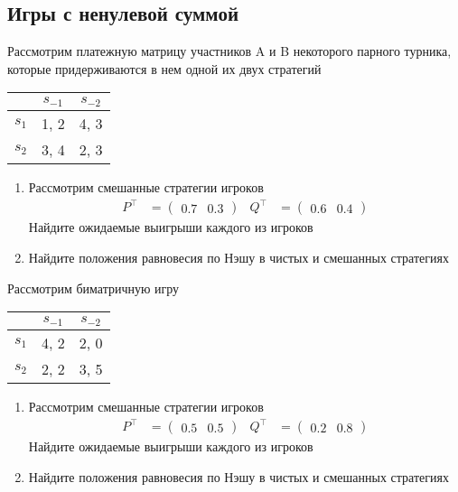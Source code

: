 \subsection{Игры с ненулевой суммой}

\begin{exercise}
Рассмотрим платежную матрицу участников A и B некоторого парного турника,
которые придерживаются в нем одной их двух стратегий
\begin{center}
	\begin{tabular}{|c||c|c|}
	\hline
	& $s_{-1}$ & $s_{-2}$  \\ \hline \hline
	$s_1$ & 1, 2 & 4, 3  \\ \hline
	$s_2$ & 3, 4 & 2, 3  \\ %
	\hline
	\end{tabular}
\end{center}
\begin{enumerate}
	\item Рассмотрим  смешанные стратегии игроков 
	\begin{align*}
		P^\top&=\begin{pmatrix} 0.7 & 0.3 \end{pmatrix} &
		Q^\top&=\begin{pmatrix} 0.6 & 0.4 \end{pmatrix}
	\end{align*}
	Найдите ожидаемые выигрыши каждого из игроков
	\item Найдите положения равновесия по Нэшу в чистых и смешанных стратегиях
\end{enumerate}
\end{exercise}

\begin{exercise}
Рассмотрим биматричную игру
\begin{center}
	\begin{tabular}{|c||c|c|}
	\hline
	& $s_{-1}$ & $s_{-2}$  \\ \hline \hline
	$s_1$ & 4, 2 & 2, 0  \\ \hline
	$s_2$ & 2, 2 & 3, 5  \\ %
	\hline
	\end{tabular}
\end{center}
\begin{enumerate}
	\item Рассмотрим смешанные стратегии игроков 
	\begin{align*}
		P^\top&=\begin{pmatrix} 0.5 & 0.5 \end{pmatrix} &
		Q^\top&=\begin{pmatrix} 0.2 & 0.8 \end{pmatrix}
	\end{align*}
	Найдите ожидаемые выигрыши каждого из игроков
	\item Найдите положения равновесия по Нэшу в чистых и смешанных стратегиях
\end{enumerate}
\end{exercise}

